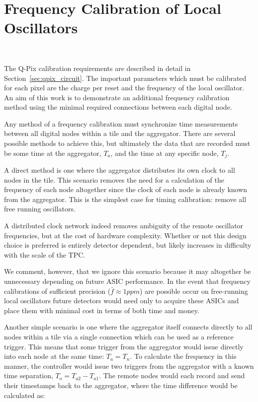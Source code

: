 \section{Frequency Calibration of Local Oscillators}~\label{sec:calib}

The Q-Pix calibration requirements are described in detail in Section~\ref{sec:qpix_circuit}.
The important parameters which must be calibrated for each pixel are the charge per reset and the frequency of the local oscillator.
An aim of this work is to demonstrate an additional frequency calibration method using the minimal required connections between each digital node.

Any method of a frequency calibration must synchronize time measurements between all digital nodes within a tile and the aggregator.
There are several possible methods to achieve this, but ultimately the data that are recorded must be some time at the aggregator, $T_{a}$, and the time at any specific node, $T_{j}$.

A direct method is one where the aggregator distributes its own clock to all nodes in the tile.
This scenario removes the need for a calculation of the frequency of each node altogether since the clock of each node is already known from the aggregator.
This is the simplest case for timing calibration: remove all free running oscillators.

A distributed clock network indeed removes ambiguity of the remote oscillator frequencies, but at the cost of hardware complexity.
Whether or not this design choice is preferred is entirely detector dependent, but likely increases in difficulty with the scale of the TPC.

We comment, however, that we ignore this scenario because it may altogether be unnecessary depending on future ASIC performance.
In the event that frequency calibrations of sufficient precision ($\bar{f} \approx 1 ppm$) are possible occur on free-running local oscillators future detectors would need only to acquire these ASICs and place them with minimal cost in terms of both time and money.

Another simple scenario is one where the aggregator itself connects directly to all nodes within a tile via a single connection which can be used as a reference trigger.
This means that some trigger from the aggregator would issue directly into each node at the same time: $T_{a} = T_{n}$.
To calculate the frequency in this manner, the controller would issue two triggers from the aggregator with a known time separation, $T_{o} = T_{a2} - T_{a1}$.
The remote nodes would each record and send their timestamps back to the aggregator, where the time difference would be calculated as:

